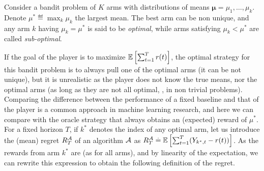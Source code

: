 \begin{definition}\label{def:2:optimalSubOptimalArms}
\begin{leftbar}[defnbar]  %
    Consider a bandit problem of $K$ arms with distributions of means $\bm{\mu}=\mu_1,\dots,\mu_k$.
    Denote $\mu^* \eqdef \max_k \mu_k$ the largest mean.
    The best arm can be non unique, and any arm $k$ having $\mu_k = \mu^*$ is said to be \emph{optimal},
    while arms satisfying $\mu_k < \mu^*$ are called \emph{sub-optimal}.
\end{leftbar}  %
\end{definition}

If the goal of the player is to maximize $\mathbb{E}\left[\sum_{t=1}^T r(t)\right]$,
the optimal strategy for this bandit problem is to always pull one of the optimal arms (it can be not unique), but it is unrealistic as the player does not know the true means, nor the optimal arms (as long as they are not all optimal, \ie, in non trivial problems).
%
Comparing the difference between the performance of a fixed baseline and that of the player is a common approach in machine learning research,
and here we can compare with the oracle strategy that always obtains an (expected) reward of $\mu^*$.
%
For a fixed horizon $T$, if $k^*$ denotes the index of any optimal arm,
let us introduce the (mean) regret $R_T^{\mathcal{A}}$ of an algorithm $\mathcal{A}$ as
$R_T^{\mathcal{A}} \overset{.}{=} \mathbb{E}\left[ \sum_{t=1}^T (Y_{k^*,t} - r(t)) \right]$.
%
As the rewards from arm $k^*$ are \iid{} (as for all arms), and by linearity of the expectation, we can rewrite this expression to obtain the following definition of the regret.


